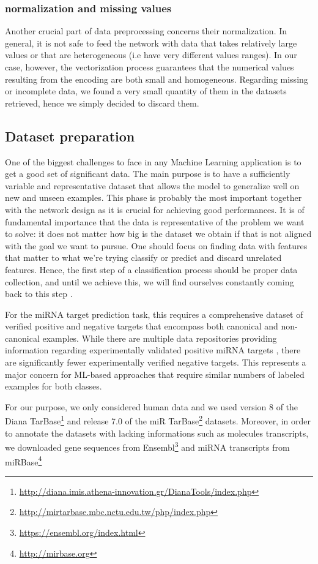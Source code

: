\subsubsection{normalization and missing values}
Another crucial part of data preprocessing concerns their normalization. In general, it is not safe to feed the network with data that takes relatively large values or that are heterogeneous (i.e have very different values ranges). In our case, however, the vectorization process guarantees that the numerical values resulting from the encoding are both small and homogeneous. Regarding missing or incomplete data, we found a very small quantity of them in the datasets retrieved, hence we simply decided to discard them.  

\subsection{Dataset preparation}
One of the biggest challenges to face in any Machine Learning application is to get a good set of significant data.
The main purpose is to have a sufficiently variable and representative dataset that allows the model to generalize well on new and unseen examples. This phase is probably the most important together with the network design as it is crucial for achieving good performances. It is of fundamental importance that the data is representative of the problem we want to solve: it does not matter how big is the dataset we obtain if that is not aligned with the goal we want to pursue. One should focus on finding data with features that matter to what we’re trying classify or predict and discard unrelated features. Hence, the first step of a classification process should be proper data collection, and until we achieve this, we will find ourselves constantly coming back to this step \cite{imbalanced_datasets}.

For the miRNA target prediction task, this requires a comprehensive dataset of verified positive and negative targets that encompass both canonical and non-canonical examples. While there are multiple data repositories providing information regarding experimentally validated positive miRNA targets\cite{dianatarbase} \cite{mirtarbase}, there are significantly fewer experimentally verified negative targets. This represents a major concern for ML-based approaches that require similar numbers of labeled examples for both classes.

For our purpose, we only considered human data and we used version 8 of the Diana TarBase\footnote{\url{http://diana.imis.athena-innovation.gr/DianaTools/index.php}} and release 7.0 of the miR TarBase\footnote{\url{http://mirtarbase.mbc.nctu.edu.tw/php/index.php}} datasets. Moreover, in order to annotate the datasets with lacking informations such as molecules transcripts, we downloaded gene sequences from Ensembl\footnote{\url{https://ensembl.org/index.html}} and miRNA transcripts from miRBase\footnote{\url{http://mirbase.org}} 


